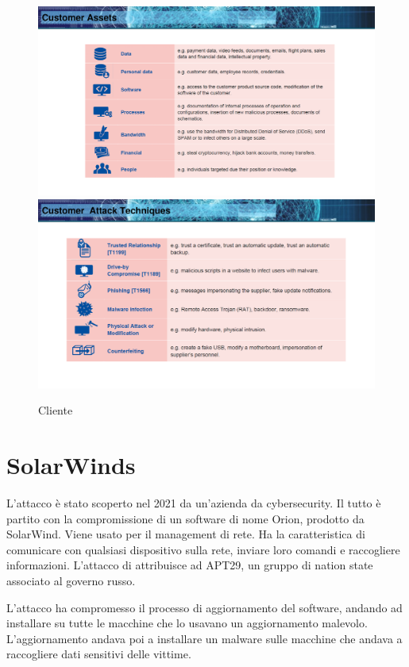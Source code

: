 \begin{figure}
    \centering
    \includegraphics[width=1\textwidth]{images/3.png}
    \includegraphics[width=1\textwidth]{images/4.png}
    \caption{Cliente}
    \label{fig:my_label2}
\end{figure}

\section{SolarWinds}
L'attacco è stato scoperto nel 2021 da un'azienda da cybersecurity. Il tutto è partito con la compromissione di un software di nome Orion, prodotto da SolarWind. Viene usato per il management di rete. Ha la caratteristica di comunicare con qualsiasi dispositivo sulla rete, inviare loro comandi e raccogliere informazioni. L'attacco di attribuisce ad APT29, un gruppo di nation state associato al governo russo.

L'attacco ha compromesso il processo di aggiornamento del software, andando ad installare su tutte le macchine che lo usavano un aggiornamento malevolo. L'aggiornamento andava poi a installare un malware sulle macchine che andava a raccogliere dati sensitivi delle vittime. 
\\

